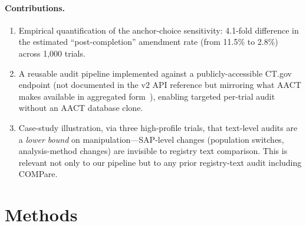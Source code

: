 \documentclass[11pt,a4paper]{article}
\begin{document}
\paragraph{Contributions.}
\begin{enumerate}\setlength\itemsep{0.2em}
    \item Empirical quantification of the anchor-choice sensitivity:
          4.1-fold difference in the estimated ``post-completion''
          amendment rate (from 11.5\% to 2.8\%) across 1{,}000 trials.
    \item A reusable audit pipeline implemented against a
          publicly-accessible CT.gov endpoint (not documented in the
          v2 API reference but mirroring what AACT makes available
          in aggregated form~\cite{aact}), enabling targeted
          per-trial audit without an AACT database clone.
    \item Case-study illustration, via three high-profile trials,
          that text-level audits are a \emph{lower bound} on
          manipulation---SAP-level changes (population switches,
          analysis-method changes) are invisible to registry text
          comparison. This is relevant not only to our pipeline but
          to any prior registry-text audit including COMPare.
\end{enumerate}

\section{Methods}
\end{document}
